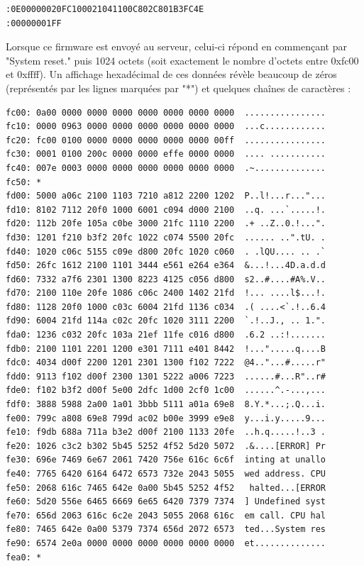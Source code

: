 \documentclass[a4paper,10pt]{article}
\begin{document}
\begin{verbatim}
:0E00000020FC100021041100C802C801B3FC4E
:00000001FF
\end{verbatim}

Lorsque ce firmware est envoyé au serveur, celui-ci répond en commençant par "System reset." puis 1024 octets (soit exactement le nombre d'octets entre 0xfc00 et 0xffff). Un affichage hexadécimal de ces données révèle beaucoup de zéros (représentés par les lignes marquées par "*") et quelques chaînes de caractères :

\begin{verbatim}
fc00: 0a00 0000 0000 0000 0000 0000 0000 0000  ................
fc10: 0000 0963 0000 0000 0000 0000 0000 0000  ...c............
fc20: fc00 0100 0000 0000 0000 0000 0000 00ff  ................
fc30: 0001 0100 200c 0000 0000 effe 0000 0000  .... ...........
fc40: 007e 0003 0000 0000 0000 0000 0000 0000  .~..............
fc50: *
fd00: 5000 a06c 2100 1103 7210 a812 2200 1202  P..l!...r..."...
fd10: 8102 7112 20f0 1000 6001 c094 d000 2100  ..q. ...`.....!.
fd20: 112b 20fe 105a c0be 3000 21fc 1110 2200  .+ ..Z..0.!...".
fd30: 1201 f210 b3f2 20fc 1022 c074 5500 20fc  ...... ..".tU. .
fd40: 1020 c06c 5155 c09e d800 20fc 1020 c060  . .lQU.... .. .`
fd50: 26fc 1612 2100 1101 3444 e561 e264 e364  &...!...4D.a.d.d
fd60: 7332 a7f6 2301 1300 8223 4125 c056 d800  s2..#....#A%.V..
fd70: 2100 110e 20fe 1086 c06c 2400 1402 21fd  !... ....l$...!.
fd80: 1128 20f0 1000 c03c 6004 21fd 1136 c034  .( ....<`.!..6.4
fd90: 6004 21fd 114a c02c 20fc 1020 3111 2200  `.!..J., .. 1.".
fda0: 1236 c032 20fc 103a 21ef 11fe c016 d800  .6.2 ..:!.......
fdb0: 2100 1101 2201 1200 e301 7111 e401 8442  !...".....q....B
fdc0: 4034 d00f 2200 1201 2301 1300 f102 7222  @4.."...#.....r"
fdd0: 9113 f102 d00f 2300 1301 5222 a006 7223  ......#...R"..r#
fde0: f102 b3f2 d00f 5e00 2dfc 1d00 2cf0 1c00  ......^.-...,...
fdf0: 3888 5988 2a00 1a01 3bbb 5111 a01a 69e8  8.Y.*...;.Q...i.
fe00: 799c a808 69e8 799d ac02 b00e 3999 e9e8  y...i.y.....9...
fe10: f9db 688a 711a b3e2 d00f 2100 1133 20fe  ..h.q.....!..3 .
fe20: 1026 c3c2 b302 5b45 5252 4f52 5d20 5072  .&....[ERROR] Pr
fe30: 696e 7469 6e67 2061 7420 756e 616c 6c6f  inting at unallo
fe40: 7765 6420 6164 6472 6573 732e 2043 5055  wed address. CPU
fe50: 2068 616c 7465 642e 0a00 5b45 5252 4f52   halted...[ERROR
fe60: 5d20 556e 6465 6669 6e65 6420 7379 7374  ] Undefined syst
fe70: 656d 2063 616c 6c2e 2043 5055 2068 616c  em call. CPU hal
fe80: 7465 642e 0a00 5379 7374 656d 2072 6573  ted...System res
fe90: 6574 2e0a 0000 0000 0000 0000 0000 0000  et..............
fea0: *
\end{verbatim}
\end{document}
